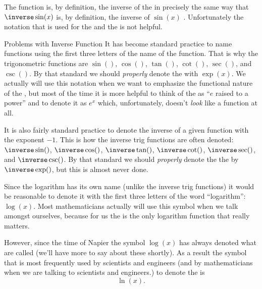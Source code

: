 The  function is, by definition, the inverse
of the  in precisely the same way that
$\inverse\sin(x)$ is, by definition, the inverse of $\sin(x)$ .
Unfortunately the notation that is used for the  and the  is not helpful.

\begin{center}
  \begin{minipage}[h]{.85\linewidth}
    \begin{mynotation}{Problems with Inverse Function}
      It has become standard practice to name functions using the
      first three letters of the name of the function. That is why the
      trigonometric functions are $\sin()$, $\cos()$, $\tan()$,
      $\cot()$, $\sec()$, and $\csc()$. By that standard we should
      \emph{properly} denote the  with
      $\exp(x)$. We actually will use this notation when we want to
      emphasize the functional nature of the , but most of the time it is more helpful to think
      of the  as ``$e$ raised to a power''
      and to denote it as $e^x$ which, unfortunately, doesn't
      \emph{look} like a function at all.      

      It is also fairly standard practice to denote the inverse of a
      given function with the exponent $-1$. This is how the inverse
      trig functions are often denoted: $\inverse\sin()$,
      $\inverse\cos()$, $\inverse\tan()$, $\inverse\cot()$,
      $\inverse\sec()$, and $\inverse\csc()$.  By that standard we
      should \emph{properly} denote the the 
      by $\inverse\exp()$, but this is almost never done.

      Since the logarithm has its own name (unlike the inverse trig
      functions) it would be reasonable to denote it with the first
      three letters of the word ``logarithm'': $\log(x)$. Most
      mathematicians actually will use this symbol when we talk
      amongst ourselves, because for us the 
      is the only logarithm function that really matters.

      However, since the time of Napier the symbol $\log(x)$ has
      always denoted what are called  (we'll
      have more to say about these shortly). As a result the symbol
      that is most frequently used by scientists and engineers (and by
      mathematicians when we are talking to scientists and engineers.)
      to denote the  is $$\ln(x).$$


\end{mynotation}
\end{minipage}
\end{center}
